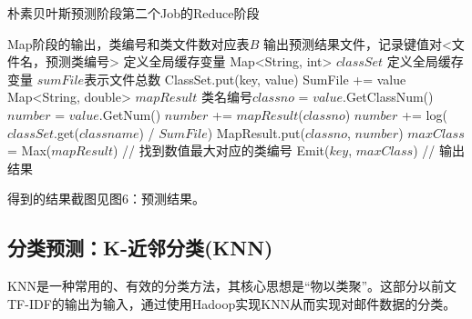 \documentclass[lang=cn,11pt]{elegantpaper}
\begin{document}
\begin{algorithm}[H]
  \caption{朴素贝叶斯预测阶段第二个Job的Reduce阶段}
  \label{alg:Framwork}
  \begin{algorithmic}[1]
    \Require
    Map阶段的输出，类编号和类文件数对应表$B$
    \Ensure
    输出预测结果文件，记录键值对<文件名，预测类编号>
  \State 定义全局缓存变量 Map<String, int> $classSet$
  \State 定义全局缓存变量 $sumFile$表示文件总数
      \State ClassSet.put(key, value)
      \State SumFile += value
    \EndFor
  \EndFunction
    \State Map<String, double> $mapResult$
        \State 类名编号$classno$ = $value$.GetClassNum()
        \State $number$ = $value$.GetNum()
          \State $number$ += $mapResult$($classno$)
        \Else
          \State $number$ += log($classSet$.get($classname$) / $SumFile$)
        \EndIf  
        \State MapResult.put($classno$, $number$)
    \EndFor
    \State $maxClass$ = Max($mapResult$) // 找到数值最大对应的类编号
    \State Emit($key$, $maxClass$) // 输出结果
  \EndFunction
  \end{algorithmic}
\end{algorithm}

得到的结果截图见图6：预测结果。
\subsection{分类预测：K-近邻分类(KNN)}
KNN是一种常用的、有效的分类方法，其核心思想是“物以类聚”。这部分以前文TF-IDF的输出为输入，通过使用Hadoop实现KNN从而实现对邮件数据的分类。
\end{document}
